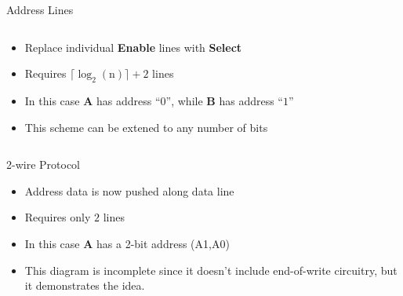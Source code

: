 \documentclass{beamer}
\begin{document}
\begin{frame}{Address Lines}
    \begin{columns}
        \begin{column}{0.33\textwidth}
            {\footnotesize
            \begin{itemize}
                \item Replace individual \textbf{Enable} lines with \textbf{Select}
                \item Requires $\lceil\log_2(\mathrm{n})\rceil+2$ lines
                \item In this case \textbf{A} has address ``$0$'', while \textbf{B} has address ``$1$''
                \item This scheme can be extened to any number of bits
            \end{itemize}
            }
        \end{column}
        \begin{column}{0.66\textwidth}
            \begin{figure}
            \end{figure}
        \end{column}
    \end{columns}
\end{frame}

\begin{frame}{2-wire Protocol}
    \begin{itemize}
        \item Address data is now pushed along data line
        \item Requires only $2$ lines
        \item In this case \textbf{A} has a 2-bit address (A1,A0)
        \item This diagram is incomplete since it doesn't include end-of-write circuitry, but it demonstrates the idea.
    \end{itemize}
    \begin{figure}
    \end{figure}
\end{frame}
\end{document}
